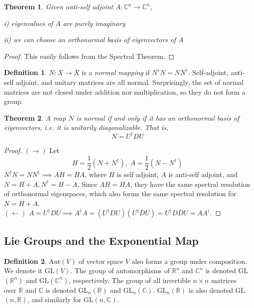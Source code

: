 \documentclass{article}
\newtheorem{theorem}{Theorem}[section]
\theoremstyle{remark}
\theoremstyle{definition}
\newtheorem{definition}{Definition}[section]
\begin{document}
\begin{theorem}
Given anti-self adjoint $A: \mathbb{C}^n \longrightarrow \mathbb{C}^n$, 

i) eigenvalues of $A$ are purely imaginary

ii) we can choose an orthonormal basis of eigenvectors of $A$
\end{theorem}

\begin{proof}
This easily follows from the Spectral Theorem. 
\end{proof}

\begin{definition}
$N: X \longrightarrow X$ is a \textit{normal mapping} if $N^\dagger N = N N^\dagger$. Self-adjoint, anti-self adjoint, and unitary matrices are all normal. Surprisingly, the set of normal matrices are not closed under addition nor multiplication, so they do not form a group. 
\end{definition}

\begin{theorem}
A map $N$ is normal if and only if it has an orthonormal basis of eigenvectors, i.e. it is unitarily diagonalizable. That is, 
\[N = U^\dagger D U \]
\end{theorem}

\begin{proof}
$(\rightarrow)$ Let 
\[H = \frac{1}{2} (N + N^\dagger), \; A = \frac{1}{2} (N - N^\dagger)\]
$N^\dagger N = N N^\dagger \implies A H = H A$, where $H$ is self adjoint, $A$ is anti-self adjoint, and $N = H + A, N^\dagger = H - A$. Since $A H = H A$, they have the same spectral resolution of orthonormal eigenspaces, which also forms the same spectral resolution for $N = H + A$. \\
$(\leftarrow)$ $A = U^\dagger D U \implies A^\dagger A = (U^\dagger D U) (U^\dagger \bar{D} U) = U^\dagger D \bar{D} U = A A^\dagger$. 
\end{proof}

\subsection{Lie Groups and the Exponential Map}
\begin{definition}
Aut$(V)$ of vector space $V$ also forms a group under composition. We denote it GL$(V)$. The group of automorphisms of $\mathbb{R}^n$ and $\mathbb{C}^n$ is denoted GL$(\mathbb{R}^n)$ and GL$(\mathbb{C}^n)$, respectively. The group of all invertible $n \times n$ matrices over $\mathbb{R}$ and $\mathbb{C}$ is denoted GL$_n(\mathbb{R})$ and GL$_n(\mathbb{C})$. GL$_n(\mathbb{R})$ is also denoted GL$(n, \mathbb{R})$, and similarly for GL$(n, \mathbb{C})$. 
\end{definition}
\end{document}
